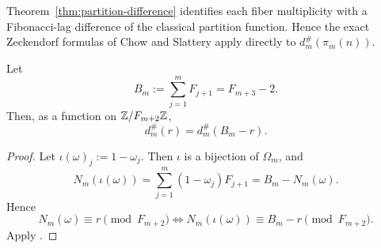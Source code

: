 \begin{remark}
\label{rem:single-fiber-literature}
Theorem~\ref{thm:partition-difference} identifies each fiber multiplicity with
a Fibonacci-lag difference of the classical partition function.  Hence the
exact Zeckendorf formulas of Chow and Slattery \cite{ChowSlattery2021} apply
directly to \(d_m^\#(\pi_m(n))\).
\end{remark}

\begin{proposition}
\label{prop:complement-symmetry}
Let
\[
  B_m:=\sum_{j=1}^mF_{j+1}=F_{m+3}-2.
\]
Then, as a function on \(\mathbb{Z}/F_{m+2}\mathbb{Z}\),
\[
  d_m^\#(r)=d_m^\#(B_m-r).
\]
\end{proposition}

\begin{proof}
Let \(\iota(\omega)_j:=1-\omega_j\).  Then \(\iota\) is a bijection of
\(\Omega_m\), and
\[
  N_m(\iota(\omega))
  =
  \sum_{j=1}^m (1-\omega_j)F_{j+1}
  =
  B_m-N_m(\omega).
\]
Hence
\[
  N_m(\omega)\equiv r \pmod{F_{m+2}}
  \iff
  N_m(\iota(\omega))\equiv B_m-r \pmod{F_{m+2}}.
\]
Apply .
\end{proof}
